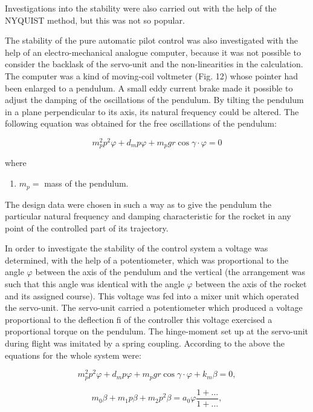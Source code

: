 \documentclass[12pt, a4paper]{article}
\begin{document}
Investigations into the stability were also carried out with the help of the NYQUIST method, but this was not so popular.

The stability of the pure automatic pilot control was also investigated with the help of an electro-mechanical analogue computer, because it was not possible to consider the backlask of the servo-unit and the non-linearities in the calculation. The computer was a kind of moving-coil voltmeter (Fig. 12) whose pointer had been enlarged to a pendulum. A small eddy current brake made it possible to adjust the damping of the oscillations of the pendulum. By tilting the pendulum in a plane perpendicular to its axis, its natural frequency could be altered. The following equation was obtained for the free oscillations of the pendulum:

\begin{equation}
  m_{p}^{2}p^{2}\varphi+d_{m}p\varphi+m_{p}gr\cos\gamma\cdot\varphi=0
\end{equation}

where
\begin{enumerate}[label={}]
  \item $m_{p} =$ mass of the pendulum.
\end{enumerate}

The design data were chosen in such a way as to give the pendulum the particular natural frequency and damping characteristic for the rocket in any point of the controlled part of its trajectory.

In order to investigate the stability of the control system a voltage was determined, with the help of a potentiometer, which was proportional to the angle $\varphi$ between the axis of the pendulum and the vertical (the arrangement was such that this angle was identical with the angle $\varphi$ between the axis of the rocket and its assigned course). This voltage was fed into a mixer unit which operated the servo-unit. The servo-unit carried a potentiometer which produced a voltage proportional to the deflection fi of the controller this voltage exercised a proportional torque on the pendulum. The hinge-moment set up at the servo-unit during flight was imitated by a spring coupling. According to the above the equations for the whole system were:

\begin{equation}
  m_{p}^{2}p^{2}\varphi+d_{m}p\varphi+m_{p}gr\cos\gamma\cdot\varphi+k_{m}\beta=0,
\end{equation}

\begin{equation}
  m_{0}\beta+m_{1}p\beta+m_{2}p^{2}\beta=a_{0}\varphi\frac{1+\hdots}{1+\hdots},
\end{equation}
\end{document}
